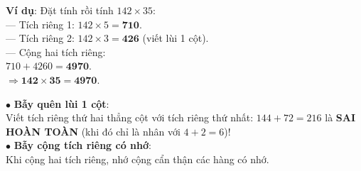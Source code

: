 \documentclass[14pt,a4paper,oneside]{extbook}
\begin{document}
\noindent
\begin{minipage}[t]{0.53\textwidth}
  \begin{tcolorbox}[
    enhanced,
    title={\footnotesize\bfseries\color{white}\faCheckCircle\ Ví dụ thực hành chuẩn mực},
    colback=green!2!white,
    colframe=green!60!black,
    arc=2.5mm, boxrule=0.8pt, top=1.8mm, bottom=1.8mm, left=2.2mm, right=2.2mm
  ]
    \footnotesize
    \textbf{Ví dụ}: Đặt tính rồi tính $142 \times 35$:\\
    --- Tích riêng 1: $142 \times 5 = \mathbf{710}$.\\
    --- Tích riêng 2: $142 \times 3 = \mathbf{426}$ (viết lùi 1 cột).\\
    --- Cộng hai tích riêng:\\
    \phantom{0}$710 + 4260 = \mathbf{4970}$.\\
    $\Rightarrow \mathbf{142 \times 35 = 4970}$.
  \end{tcolorbox}
\end{minipage}%
\hfill
\begin{minipage}[t]{0.45\textwidth}
  \begin{tcolorbox}[
    enhanced,
    title={\footnotesize\bfseries\color{white}\faExclamationTriangle\ Mẹo tránh bẫy trắc nghiệm},
    colback=red!2!white,
    colframe=red!70!black,
    arc=2.5mm, boxrule=0.8pt, top=1.8mm, bottom=1.8mm, left=2.2mm, right=2.2mm
  ]
    \footnotesize
    $\bullet$ \textbf{Bẫy quên lùi 1 cột}:\\
    Viết tích riêng thứ hai thẳng cột với tích riêng thứ nhất: $144 + 72 = 216$ là \textbf{SAI HOÀN TOÀN} (khi đó chỉ là nhân với $4 + 2 = 6$)!\\
    $\bullet$ \textbf{Bẫy cộng tích riêng có nhớ}:\\
    Khi cộng hai tích riêng, nhớ cộng cẩn thận các hàng có nhớ.
  \end{tcolorbox}
\end{minipage}
\end{document}
